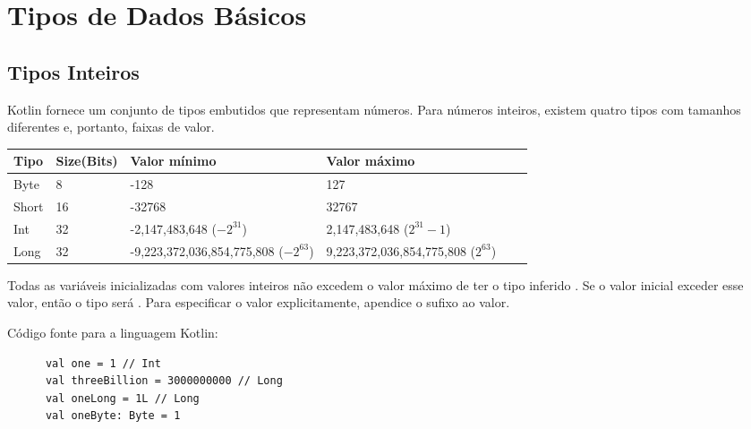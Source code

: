 \section{Tipos de Dados B\'{a}sicos}
         
 \lipsum[2]
  \subsection{Tipos Inteiros}
  Kotlin fornece um conjunto de tipos embutidos que representam números.
  Para números inteiros, existem quatro tipos com tamanhos diferentes e, portanto, faixas de valor.
    \begin{table}[ht]
      \centering
      
      \begin{tabular}{|p{2cm} p{1.5cm} p{6.0cm} p{6.0cm}| cp{2cm}}
      \hline
      \textbf{Tipo} \centering & \textbf{Size(Bits)} & \textbf{Valor mínimo} & \textbf{Valor máximo} \\ \hline
          Byte \centering    & 8  \centering  & -128   & 127                 \\ 
          Short \centering  & 16  \centering & -32768   & 32767             \\ 
          Int \centering    & 32  \centering &  -2,147,483,648 ($-2 ^{31}$)      &2,147,483,648 ($2^{31}-1$)            \\ 
          Long \centering    & 32  \centering &  -9,223,372,036,854,775,808 ($-2 ^{63}$)      &9,223,372,036,854,775,808 ($2^{63}$)              \\ \hline
      
      \end{tabular}
      \label{Tabela1}
      \end{table}
      Todas as variáveis inicializadas com valores inteiros não excedem o valor 
      máximo de ter o tipo inferido . Se o valor inicial exceder esse valor, 
      então o tipo será . Para especificar o valor explicitamente, apendice o sufixo ao valor.
     

    C\'{o}digo fonte para a linguagem Kotlin:
    \begin{lstlisting}
      val one = 1 // Int
      val threeBillion = 3000000000 // Long
      val oneLong = 1L // Long
      val oneByte: Byte = 1
  
    \end{lstlisting}

